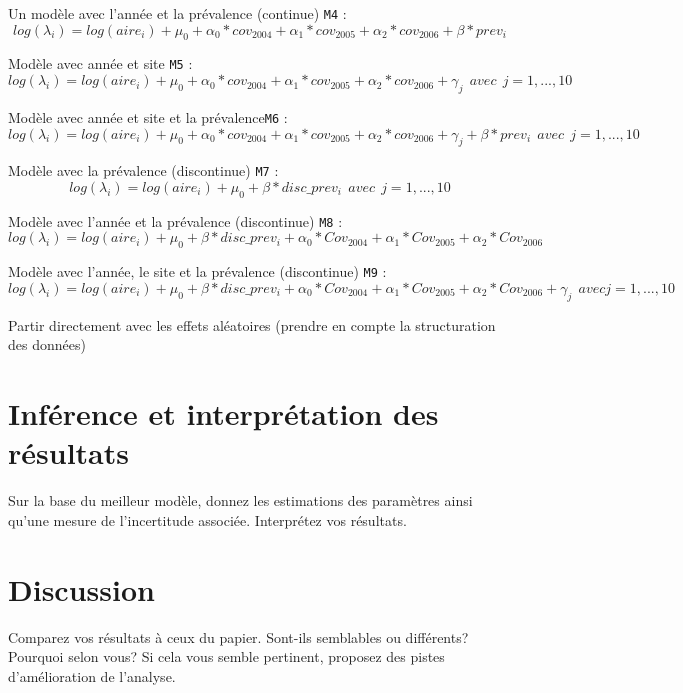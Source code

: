 \documentclass[
]{article}
\begin{document}
Un modèle avec l'année et la prévalence (continue) \texttt{M4} :
\[log(\lambda_i) =  log({aire_{i}}) + \mu_0 + \alpha_0 * cov_{2004}+\alpha_1 * cov_{2005} +\alpha_2 * cov_{2006} + \beta * prev_i \]

Modèle avec année et site \texttt{M5} :
\[log(\lambda_i) =  log({aire_{i}}) + \mu_0 + \alpha_0 * cov_{2004}+\alpha_1 * cov_{2005} +\alpha_2 * cov_{2006}+ \gamma_j\:\:avec\:\:j=1,...,10\]

Modèle avec année et site et la prévalence\texttt{M6} :
\[log(\lambda_i) =  log({aire_{i}}) + \mu_0 + \alpha_0 * cov_{2004}+\alpha_1 * cov_{2005} +\alpha_2 * cov_{2006}+ \gamma_j + \beta * prev_i\:\:avec\:\:j=1,...,10\]

Modèle avec la prévalence (discontinue) \texttt{M7} :
\[log(\lambda_i) =  log({aire_{i}}) + \mu_0 + \beta * disc\_prev_i\:\:avec\:\:j=1,...,10\]

Modèle avec l'année et la prévalence (discontinue) \texttt{M8} :
\[log(\lambda_i) =  log({aire_{i}}) + \mu_0 + \beta * disc\_prev_i + \alpha_0 * Cov_{2004} + \alpha_1 * Cov_{2005} + \alpha_2*Cov_{2006}\]

Modèle avec l'année, le site et la prévalence (discontinue) \texttt{M9}
:
\[log(\lambda_i) =  log({aire_{i}}) + \mu_0 + \beta * disc\_prev_i + \alpha_0 * Cov_{2004} + \alpha_1 * Cov_{2005} + \alpha_2*Cov_{2006} + \gamma_j \:\: avec j = 1,...,10\]

Partir directement avec les effets aléatoires (prendre en compte la
structuration des données)

\hypertarget{infuxe9rence-et-interpruxe9tation-des-ruxe9sultats}{%
\section{\texorpdfstring{\textbf{Inférence et interprétation des
résultats}}{Inférence et interprétation des résultats}}\label{infuxe9rence-et-interpruxe9tation-des-ruxe9sultats}}

Sur la base du meilleur modèle, donnez les estimations des paramètres
ainsi qu'une mesure de l'incertitude associée. Interprétez vos
résultats.

\hypertarget{discussion}{%
\section{\texorpdfstring{\textbf{Discussion}}{Discussion}}\label{discussion}}

Comparez vos résultats à ceux du papier. Sont-ils semblables ou
différents? Pourquoi selon vous? Si cela vous semble pertinent, proposez
des pistes d'amélioration de l'analyse.
\end{document}
